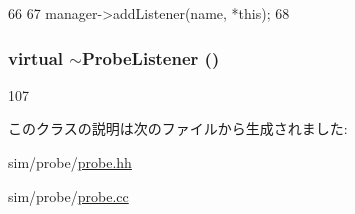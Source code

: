\begin{DoxyCode}
66 {
67     manager->addListener(name, *this);
68 }
\end{DoxyCode}
\hypertarget{classProbeListener_ac26e1b05050a3b59bf16a81d372c7de6}{
\subsubsection[{$\sim$ProbeListener}]{\setlength{\rightskip}{0pt plus 5cm}virtual $\sim${\bf ProbeListener} ()}}
\label{classProbeListener_ac26e1b05050a3b59bf16a81d372c7de6}



\begin{DoxyCode}
107 {}
\end{DoxyCode}


このクラスの説明は次のファイルから生成されました:\begin{DoxyCompactItemize}
\item 
sim/probe/\hyperlink{probe_8hh}{probe.hh}\item 
sim/probe/\hyperlink{probe_8cc}{probe.cc}\end{DoxyCompactItemize}
